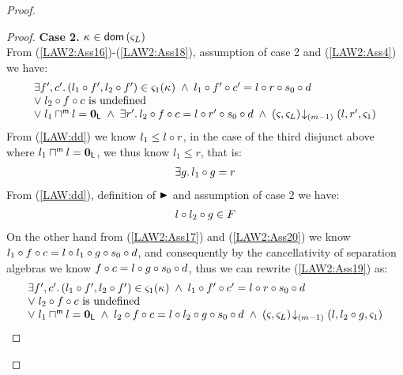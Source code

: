 \begin{lemma}[]
\begin{proof}
\begin{proof}
\noindent\textbf{Case 2. }$\kappa_{} \in \textsf{dom}\left( \varsigma_{L} \right)$\\
From (\ref{LAW2:Ass16})-(\ref{LAW2:Ass18}), assumption of case 2 and (\ref{LAW2:Ass4}) we have:
%
\begin{align}
	\begin{array}{l}
  	\exists f', c'.\, (l_1 \circ f', l_2 \circ f') \in \varsigma_{1}(\kappa_{}) \;\land\; l_1 \circ f' \circ c' =  l \circ r \circ s_0 \circ d\\
		\lor\;l_2 \circ f \circ c \text{ is undefined}\\
		\lor\; l_1 \sqcap_{}^{\textsf{m}} l = \mathbf{0}_{\textsf{L}} \;\land\; \exists r'.\, l_2 \circ f \circ c = l \circ r' \circ s_0 \circ d \;\land\; \left(\varsigma_{}, \varsigma_{L}\right) \!\downarrow_{(m-1)} \left(l, r', \varsigma_{1}\right)
	\end{array} \label{LAW2:Ass19}
\end{align}
%
From (\ref{LAW:dd}) we know $l_1 \leq l \circ r$, in the case of the third disjunct above where $l_1 \sqcap_{}^{\textsf{m}} l = \mathbf{0}_{\textsf{L}}$, we thus know $l_1 \leq r$, that is:
\begin{align}
	\exists g.\, l_1 \circ g = r \label{LAW2:Ass20}
\end{align}
From (\ref{LAW:dd}), definition of $\strictfences$ and assumption of case 2 we have:
%
\begin{align}
	l \circ l_2 \circ g \in F \label{LAW2:Ass21}
\end{align}
%
On the other hand from (\ref{LAW2:Ass17}) and (\ref{LAW2:Ass20}) we know $l_1 \circ f \circ c = l \circ l_1 \circ g \circ s_0 \circ d$, and consequently by the cancellativity of separation algebras we know $f \circ c = l \circ g \circ s_0 \circ d$, thus we can rewrite (\ref{LAW2:Ass19}) as:
%
\begin{align}
	\begin{array}{l}
  	\exists f', c'.\, (l_1 \circ f', l_2 \circ f') \in \varsigma_{1}(\kappa_{}) \;\land\; l_1 \circ f' \circ c' =  l \circ r \circ s_0 \circ d\\
		\lor\;l_2 \circ f \circ c \text{ is undefined}\\
		\lor\; l_1 \sqcap_{}^{\textsf{m}} l = \mathbf{0}_{\textsf{L}} \;\land\; l_2 \circ f \circ c = l \circ l_2 \circ g \circ s_0 \circ d \;\land\; \left(\varsigma_{}, \varsigma_{L}\right) \!\downarrow_{(m-1)} \left(l, l_2 \circ g, \varsigma_{1}\right)
	\end{array} \label{LAW2:Ass22}
\end{align}

\end{proof}
\end{proof}
\end{lemma}
